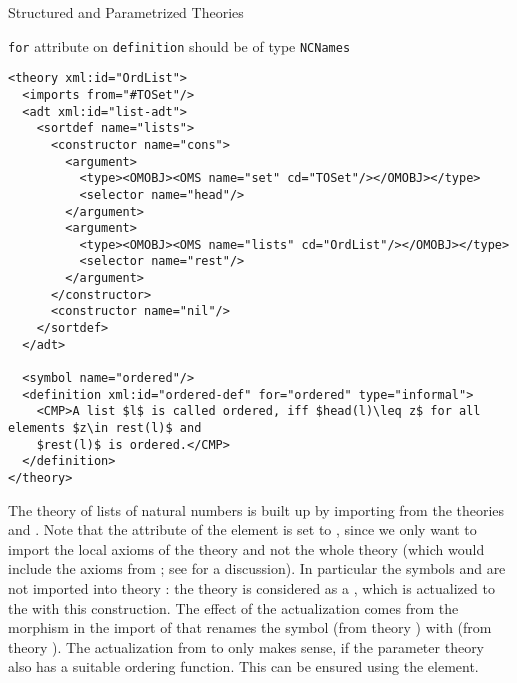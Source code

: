 \begin{tchapter}[id=natlist]{Structured and Parametrized Theories}
\begin{erratum}[reported-by=Michael Kohlhase,date=2009-08-11]{{\texttt{for}} attribute on
    {\texttt{definition}} should be of type {\texttt{NCNames}}}
\begin{lstlisting}[mathescape,label=ordered-list,
  index={theory,imports,adt,sortdef,constructor,argument,symbol,definition}]
<theory xml:id="OrdList">
  <imports from="#TOSet"/>
  <adt xml:id="list-adt">
    <sortdef name="lists">
      <constructor name="cons">
        <argument>
          <type><OMOBJ><OMS name="set" cd="TOSet"/></OMOBJ></type>
          <selector name="head"/>
        </argument>
        <argument>
          <type><OMOBJ><OMS name="lists" cd="OrdList"/></OMOBJ></type>
          <selector name="rest"/>
        </argument>
      </constructor>
      <constructor name="nil"/>
    </sortdef>
  </adt>

  <symbol name="ordered"/>
  <definition xml:id="ordered-def" for="ordered" type="informal">
    <CMP>A list $l$ is called ordered, iff $head(l)\leq z$ for all elements $z\in rest(l)$ and
    $rest(l)$ is ordered.</CMP>
  </definition>
</theory>
\end{lstlisting}
\end{erratum}

The theory {} of lists of natural numbers is built up by
importing from the theories {} and {}. Note that the
attribute {} of the {} element
{} is set to {}, since we
only want to import the local axioms of the theory {} and not the
whole theory {} (which would include the axioms from
{}; see {} for a discussion). In
particular the symbols {} and {} are not imported into
theory {}: the theory {} is considered as a
{}, which is actualized to the
{} with this construction.  The effect of the
actualization comes from the morphism {} in the import of
{} that renames the symbol {} (from theory
{}) with {} (from theory {}). The
actualization from {} to {} only makes sense, if
the parameter theory {} also has a suitable ordering function.  This
can be ensured using the {\omdoc} {} element.


\end{tchapter}

